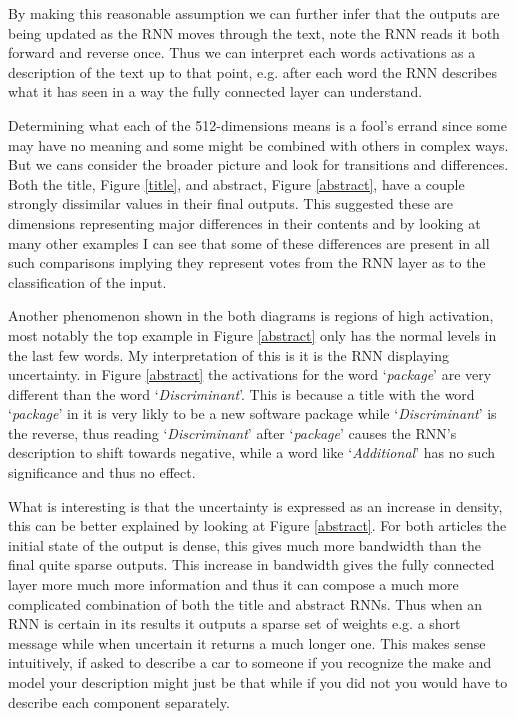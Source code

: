 \documentclass[12pt, a4paper]{article}
\begin{document}
By making this reasonable assumption we can further infer that the outputs are being updated as the RNN moves through the text, note the RNN reads it both forward and reverse once. Thus we can interpret each words activations as a description of the text up to that point, e.g. after each word the RNN describes what it has seen in a way the fully connected layer can understand.

Determining what each of the 512-dimensions means is a fool's errand since some may have no meaning and some might be combined with others in complex ways. But we cans consider the broader picture and look for transitions and differences. Both the title, Figure \ref{title}, and abstract, Figure \ref{abstract}, have a couple strongly dissimilar values in their final outputs. This suggested these are dimensions representing major differences in their contents and by looking at many other examples I can see that some of these differences are present in all such comparisons implying they represent votes from the RNN layer as to the classification of the input.

Another phenomenon shown in the both diagrams is regions of high activation, most notably the top example in Figure \ref{abstract} only has the normal levels in the last few words. My interpretation of this is it is the RNN displaying uncertainty. in Figure \ref{abstract} the activations for the word `\textit{package}' are very different than the word `\textit{Discriminant}'. This is because a title with the word `\textit{package}' in it is very likly to be a new software package while `\textit{Discriminant}' is the reverse, thus reading `\textit{Discriminant}' after `\textit{package}' causes the RNN's description to shift towards negative, while a word like `\textit{Additional}' has no such significance and thus no effect. 

What is interesting is that the uncertainty is expressed as an increase in density, this can be better explained by looking at Figure \ref{abstract}. For both articles the initial state of the output is dense, this gives much more bandwidth than the final quite sparse outputs. This increase in bandwidth gives the fully connected layer more much more information and thus it can compose a much more complicated combination of both the title and abstract RNNs. Thus when an RNN is certain in its results it outputs a sparse set of weights e.g. a short message while when uncertain it returns a much longer one. This makes sense intuitively, if asked to describe a car to someone if you recognize the make and model your description might just be that while if you did not you would have to describe each component separately.
\end{document}
